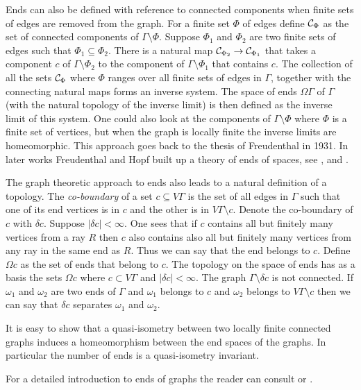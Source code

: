 \documentclass{emsprocart}
\theoremstyle{definition}
\begin{document}
Ends can also be defined with reference to connected components when
finite sets of edges are removed from the graph.  For a finite set
$\Phi$ of edges define ${\cal C}_\Phi$ as the set of connected
components of $\Gamma\setminus \Phi$.
Suppose $\Phi_1$ and
$\Phi_2$ are two finite sets of edges such that
$\Phi_1\subseteq\Phi_2$.
There is a natural map ${\cal C}_{\Phi_2}\rightarrow {\cal
  C}_{\Phi_1}$ that takes a component $c$ of $\Gamma\setminus \Phi_2$ to
the component of $\Gamma\setminus \Phi_1$ that contains $c$.  The collection of all the sets ${\cal C}_\Phi$ where
$\Phi$ ranges over all finite sets of edges in $\Gamma$, together
with the connecting natural maps forms an
inverse system.  The space of ends $\Omega\Gamma$ of $\Gamma$
(with the natural topology of the
inverse limit) is then defined as the inverse
limit of this system.  One could also look at the components of
$\Gamma\setminus \Phi$ where $\Phi$ is a finite set of vertices, but
when the graph is locally finite the inverse limits are homeomorphic.
 This approach goes back to the thesis of Freudenthal in 1931.  In later works
Freudenthal and Hopf built up a theory of ends of spaces, see
\cite{Freudenthal1942}, \cite{Freudenthal1945} and \cite{Hopf1944}.

The graph theoretic approach to ends also leads to a natural definition of a topology.  The {\em co-boundary} of a set $c\subseteq V\Gamma$ is the set of all edges in
 $\Gamma$ such that one of its end vertices is in $c$ and the other is in
 $V\Gamma\setminus c$.  Denote the co-boundary of $c$ with $\delta c$.
Suppose $|\delta c|<\infty$.
One sees that if $c$ contains all but finitely many vertices
 from a ray $R$ then $c$ also contains also all but
finitely many vertices from
 any ray in the same end as $R$.  Thus we can say that the end
 belongs to $c$.  Define $\Omega c$ as the set of ends that belong to $c$.
The topology on the
 space of ends has as a basis the sets $\Omega c$ where $c\subset
 V\Gamma$ and $|\delta c|<\infty$.
The graph $\Gamma\setminus\delta c$ is not connected.  If
 $\omega_1$ and $\omega_2$ are two ends of $\Gamma$ and $\omega_1$ belongs
 to $c$ and $\omega_2$ belongs to $V\Gamma \setminus c$ then we can say that
 $\delta c$ separates $\omega_1$ and $\omega_2$.

It is easy to show that a quasi-isometry between two locally finite
connected graphs induces a homeomorphism between the end spaces
of the graphs.  In particular the number of ends is a quasi-isometry
invariant.

For a detailed introduction to ends of graphs the reader can
consult \cite{Moller1995} or \cite{DiestelKuhn2003}.
\end{document}
